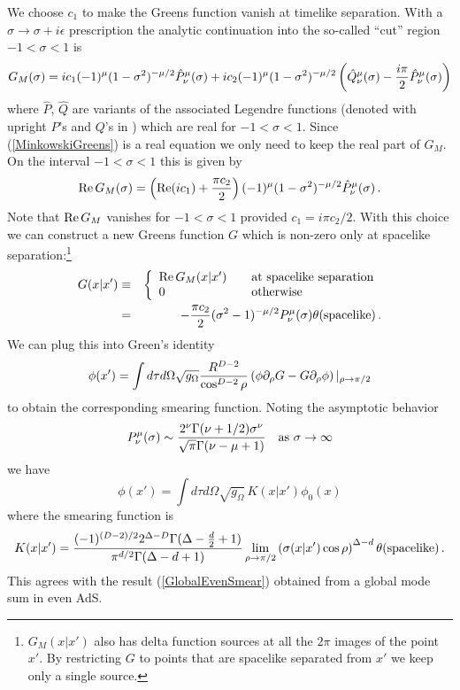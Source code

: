 \documentclass[12pt]{article}
\newcommand{\bea}{\begin{eqnarray}}
\newcommand{\eea}{\end{eqnarray}}
\begin{document}
We choose $c_1$ to make the Greens function vanish at timelike
separation.  With a $\sigma \rightarrow \sigma + i \epsilon$
prescription the analytic continuation into the so-called ``cut''
region $-1 < \sigma < 1$ is \cite{Bateman}
\begin{equation}
G_M(\sigma) = i c_1 (-1)^\mu (1 - \sigma^2)^{-\mu/2} \hat{P}^\mu_\nu(\sigma) + i c_2 (-1)^\mu (1 - \sigma^2)^{-\mu/2}
\left(\hat{Q}^\mu_\nu(\sigma) - {i \pi \over 2} \hat{P}^\mu_\nu(\sigma)\right)
\end{equation}
where $\hat{P}$, $\hat{Q}$ are variants of the associated Legendre
functions (denoted with upright $P$'s and $Q$'s in \cite{Bateman})
which are real for $-1 < \sigma < 1$.  Since (\ref{MinkowskiGreens})
is a real equation we only need to keep the real part of $G_M$.  On the interval
$-1 < \sigma < 1$ this is given by
\begin{equation}
{\rm Re} \, G_M(\sigma) = \left({\rm Re}(i c_1) + {\pi c_2 \over 2}\right)
(-1)^\mu (1 - \sigma^2)^{-\mu/2} \hat{P}^\mu_\nu(\sigma)\,.
\end{equation}
Note that ${\rm Re} \, G_M$ vanishes for $-1 < \sigma < 1$ provided $c_1 = i \pi c_2 / 2$.  With this choice we
can construct a new Greens function $G$ which is non-zero only
at spacelike separation:\footnote{$G_M(x \vert x')$ also has delta
function sources at all the $2 \pi$ images of the point $x'$.  By
restricting $G$ to points that are spacelike separated from $x'$ we keep
only a single source.}
\bea
\nonumber
G(x \vert x') & \equiv & \left\lbrace
\begin{array}{ll}
{\rm Re} \, G_M(x \vert x')  &   \quad \hbox{\rm at spacelike separation} \\
0  &   \quad \hbox{\rm otherwise}
\end{array}
\right. \\
& = & - {\pi c_2 \over 2} (\sigma^2 - 1)^{-\mu/2} P^\mu_\nu(\sigma) \theta({\rm spacelike}) \,.
\eea
We can plug this into Green's identity
\begin{equation}
\phi(x') = \int d\tau d\Omega \sqrt{g_\Omega} {R^{D-2} \over \cos^{D-2} \rho} \left(\phi \partial_\rho G - G \partial_\rho \phi\right)
\vert_{\rho \rightarrow \pi/2}
\end{equation}
to obtain the corresponding smearing function.  Noting the asymptotic behavior
\begin{equation}
P^\mu_\nu(\sigma) \sim {2^\nu \Gamma(\nu + 1/2) \sigma^\nu \over \sqrt{\pi} \Gamma(\nu-\mu+1)} \quad
\hbox{\rm as $\sigma \rightarrow \infty$}
\end{equation}
we have
\begin{equation}
\phi(x') = \int d\tau d\Omega \sqrt{g_\Omega} \, K(x \vert x') \phi_0(x)
\end{equation}
where the smearing function is
\begin{equation}
\label{GlobalEvenGreens}
K(x \vert x') = {(-1)^{(D-2)/2} 2^{\Delta - D} \Gamma(\Delta - {d \over 2} + 1) \over \pi^{d/2} \Gamma(\Delta - d + 1)}
\lim_{\rho \rightarrow \pi/2} \left(\sigma(x \vert x') \cos \rho \right)^{\Delta - d} \theta({\rm spacelike})\,.
\end{equation}
This agrees with the result (\ref{GlobalEvenSmear}) obtained from a global mode sum in even AdS.
\end{document}
